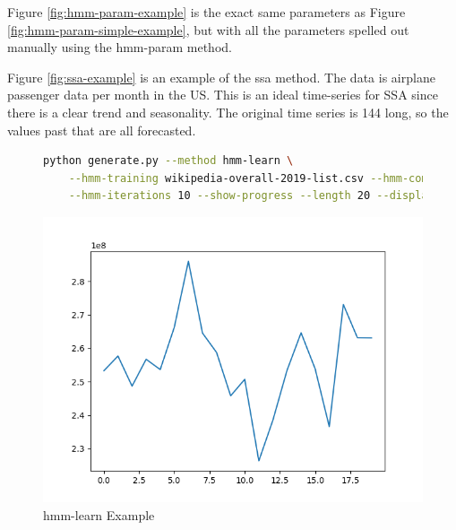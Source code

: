 Figure \ref{fig:hmm-param-example} is the exact same parameters as Figure \ref{fig:hmm-param-simple-example}, but with all the parameters spelled out manually using the hmm-param method. 

Figure \ref{fig:ssa-example} is an example of the ssa method. The data is airplane passenger data per month in the US. This is an ideal time-series for SSA since there is a clear trend and seasonality. The original time series is 144 long, so the values past that are all forecasted.

\begin{figure}
\begin{lstlisting}[language=bash]
    python generate.py --method hmm-learn \
    --hmm-training wikipedia-overall-2019-list.csv --hmm-components 4 \
    --hmm-iterations 10 --show-progress --length 20 --display
\end{lstlisting}
\includegraphics[scale=0.7]{figures/hmm-learn}
\caption{hmm-learn Example}    
\label{fig:hmm-learn-example}
\end{figure}

